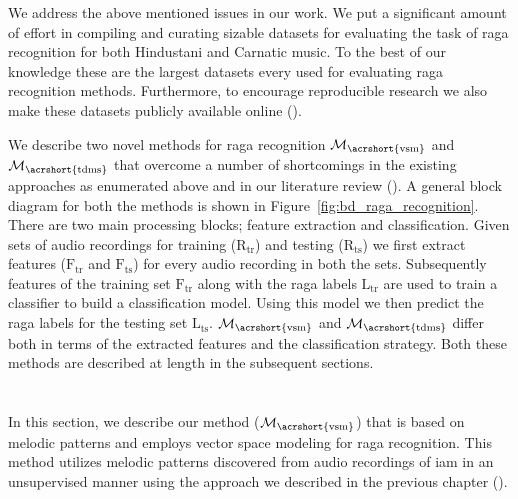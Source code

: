We address the above mentioned issues in our work. We put a significant amount of effort in compiling and curating sizable datasets for evaluating the task of \gls{raga} recognition for both Hindustani and Carnatic music. To the best of our knowledge these are the largest datasets every used for evaluating \gls{raga} recognition methods. Furthermore, to encourage reproducible research we also make these datasets publicly available online (). 

We describe two novel methods for \gls{raga} recognition $\mathcal{M}_\mathrm{\acrshort{vsm}}$ and $\mathcal{M}_\mathrm{\acrshort{tdms}}$ that overcome a number of shortcomings in the existing approaches as enumerated above and in our literature review (). A general block diagram for both the methods is shown in Figure~\ref{fig:bd_raga_recognition}. There are two main processing blocks; feature extraction and classification. Given sets of audio recordings for training ($\mathrm{R}_\mathrm{tr}$) and testing ($\mathrm{R}_\mathrm{ts}$) we first extract features ($\mathrm{F}_\mathrm{tr}$ and $\mathrm{F}_\mathrm{ts}$) for every audio recording in both the sets. Subsequently features of the training set $\mathrm{F}_\mathrm{tr}$ along with the \gls{raga} labels $\mathrm{L}_\mathrm{tr}$ are used to train a classifier to build a classification model. Using this model we then predict the \gls{raga} labels for the testing set $\mathrm{L}_\mathrm{ts}$. $\mathcal{M}_\mathrm{\acrshort{vsm}}$ and $\mathcal{M}_\mathrm{\acrshort{tdms}}$ differ both in terms of the extracted features and the classification strategy. Both these methods are described at length in the subsequent sections.



\section{}
\label{sec:phrase_based_feature_extraction}

In this section, we describe our method ($\mathcal{M}_\mathrm{\acrshort{vsm}}$) that is based on melodic patterns and employs vector space modeling for \gls{raga} recognition. This method utilizes melodic patterns discovered from audio recordings of \gls{iam} in an unsupervised manner using the approach we described in the previous chapter (\chapref{}). 


